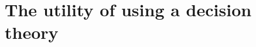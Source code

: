 \documentclass[a4paper,final]{article}
\newcommand\EU{\mathrm{EU}}
\newcommand\U{\mathfrak{U}} %
\newcommand{\todoold}[2][]{\todo[backgroundcolor=white,bordercolor=orange!10,linecolor=gray!10, #1,caption={},textcolor=gray]{Pre-rev: #2}}
\newcommand{\todooldinfo}[2][]{\todoold[#1]{#2}}
\renewcommand{\color}[1]{}
\newenvironment{colored}[1]{\leavevmode\color{#1}}{}
\newenvironment{CCM rewritten}
{\begingroup\color{blue}} %
{\endgroup}              %
\begin{document}






\section{The utility of using a decision theory}\label{sect:nu}




\end{document}
